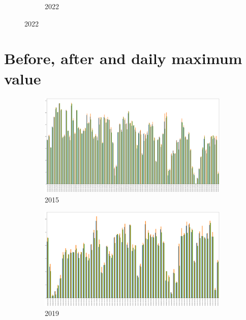 \begin{figure}[h]
\begin{subfigure}{0.45\textwidth}
		\caption{2022}
	\end{subfigure}
	\label{fig:daily_bui_maxmin}
\end{figure}

\FloatBarrier

\section{Before, after and daily maximum value}

\begin{figure}[h]
	\centering
	\caption{Before, after and daily FWI maximum value}
	\begin{subfigure}{0.45\textwidth}
		\centering
		\includegraphics[width=\textwidth]{graphs/2015/byHour/fwi_max_before_after.png}
		\caption{2015}
	\end{subfigure}
	\hfill
	\begin{subfigure}{0.45\textwidth}
		\centering
		\includegraphics[width=\textwidth]{graphs/2019/byHour/FWI_max_before_after.png}
		\caption{2019}
	\end{subfigure}
	\hfill
	\begin{subfigure}{0.45\textwidth}
		\centering

\end{subfigure}
\end{figure}
